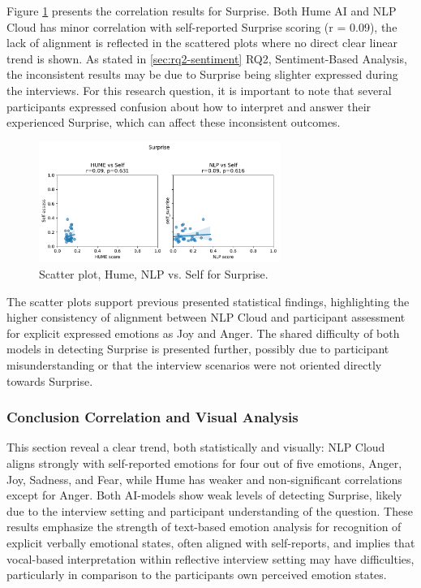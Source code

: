 Figure \ref{fig:scatter-surprise-rq3} presents the correlation results for Surprise. Both Hume AI and NLP Cloud has minor correlation with self-reported Surprise scoring (r = 0.09), the lack of alignment is reflected in the scattered plots where no direct clear linear trend is shown. 
As stated in \ref{sec:rq2-sentiment} RQ2, Sentiment-Based Analysis, the inconsistent results may be due to Surprise being slighter expressed during the interviews. For this research question, it is important to note that several participants expressed confusion about how to interpret and answer 
their experienced Surprise, which can affect these inconsistent outcomes. 
\begin{figure}[!h]
    \centering
    \includegraphics[width=0.7\textwidth]{png/results/rq3/scatter_surprise_vs_self.pdf}
    \caption{Scatter plot, Hume, NLP vs. Self for Surprise.}
    \label{fig:scatter-surprise-rq3}
\end{figure}

The scatter plots support previous presented statistical findings, highlighting the higher consistency of alignment between NLP Cloud and participant assessment for explicit expressed emotions as Joy and Anger. 
The shared difficulty of both models in detecting Surprise is presented further, possibly due to participant misunderstanding or that the interview scenarios were not oriented directly towards Surprise. 

\subsubsection{Conclusion Correlation and Visual Analysis}
This section reveal a clear trend, both statistically and visually: NLP Cloud aligns strongly with self-reported emotions for four out of five emotions, Anger, Joy, Sadness, and Fear, while Hume has weaker and 
non-significant correlations except for Anger. Both AI-models show weak levels of detecting Surprise, likely due to the interview setting and participant understanding of the question. 
These results emphasize the strength of text-based emotion analysis for recognition of explicit verbally emotional states, often aligned with self-reports, and 
implies that vocal-based interpretation within reflective interview setting may have difficulties, particularly in comparison to the participants own perceived emotion states. 

